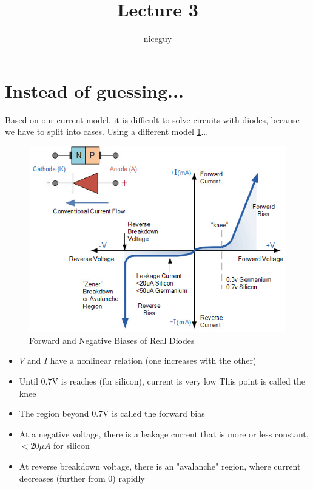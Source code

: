 \documentclass[12pt]{article}
\title{Lecture 3}
\author{niceguy}
\begin{document}
\maketitle

\section{Instead of guessing...}

Based on our current model, it is difficult to solve circuits with diodes, because we have to split into cases. Using a different model \ref{diode}...

\begin{figure} \label{diode}
    \includegraphics[width=\textwidth]{diode.jpg}
    \caption{Forward and Negative Biases of Real Diodes}
\end{figure}

\begin{itemize}
    \item $V$ and $I$ have a nonlinear relation (one increases with the other)
    \item Until 0.7V is reaches (for silicon), current is very low
        This point is called the knee
    \item The region beyond 0.7V is called the forward bias
    \item At a negative voltage, there is a leakage current that is more or less constant, $<20\unit{\mu A}$ for silicon
    \item At reverse breakdown voltage, there is an "avalanche" region, where current decreases (further from 0) rapidly
\end{itemize}
\end{document}
